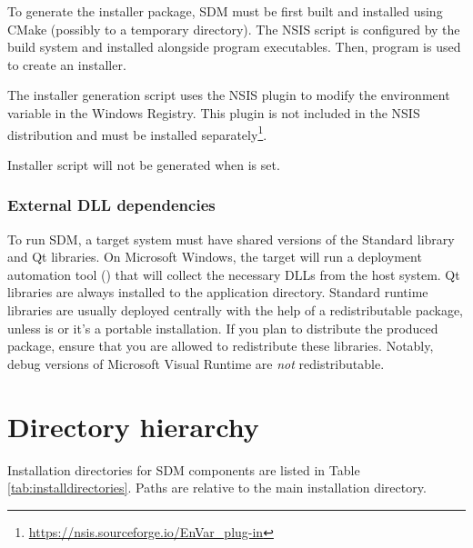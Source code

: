 \documentclass[a4paper,12pt,twoside,extrafontsizes]{memoir}
\begin{document}
To generate the installer package, SDM must be first built and installed using CMake (possibly to a temporary directory). The NSIS script is configured by the build system and installed alongside program executables. Then,  program is used to create an installer.

The installer generation script uses the  NSIS plugin to modify the  environment variable in the Windows Registry. This plugin is not included in the NSIS distribution and must be installed separately\footnote{\url{https://nsis.sourceforge.io/EnVar_plug-in}}.

Installer script will not be generated when  is set.

\subsubsection{External DLL dependencies}

To run SDM, a target system must have shared versions of the Standard \cplusplus{} library and Qt libraries. On Microsoft Windows, the  target will run a deployment automation tool () that will collect the necessary DLLs from the host system. Qt libraries are always installed to the application directory. Standard \cplusplus{} runtime libraries are usually deployed centrally with the help of a redistributable package, unless  is  or it's a portable installation. If you plan to distribute the produced package, ensure that you are allowed to redistribute these libraries. Notably, debug versions of Microsoft Visual \cplusplus{} Runtime are \emph{not} redistributable.

\section{Directory hierarchy}
\label{sec:installdirectories}

Installation directories for SDM components are listed in Table \ref{tab:installdirectories}. Paths are relative to the main installation directory.
\end{document}
